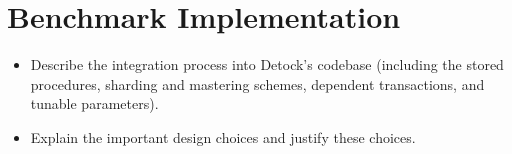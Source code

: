 \section{Benchmark Implementation}
\label{sec: benchmark-implementation}

\begin{itemize}
    \item Describe the integration process into Detock's codebase (including the stored procedures, sharding and mastering schemes, dependent transactions, and tunable parameters).
    \item Explain the important design choices and justify these choices.
\end{itemize}